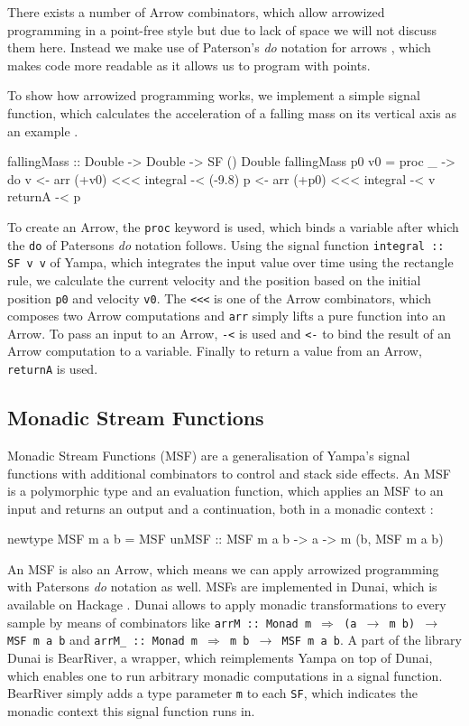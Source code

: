 There exists a number of Arrow combinators, which allow arrowized programming in a point-free style but due to lack of space we will not discuss them here. Instead we make use of Paterson's \textit{do} notation for arrows \cite{paterson_new_2001}, which makes code more readable as it allows us to program with points.

To show how arrowized programming works, we implement a simple signal function, which calculates the acceleration of a falling mass on its vertical axis as an example \cite{perez_testing_2017}.

\begin{HaskellCode}
fallingMass :: Double -> Double -> SF () Double
fallingMass p0 v0 = proc _ -> do
  v <- arr (+v0) <<< integral -< (-9.8)
  p <- arr (+p0) <<< integral -< v
  returnA -< p
\end{HaskellCode}

To create an Arrow, the \texttt{proc} keyword is used, which binds a variable after which the \texttt{do} of Patersons \textit{do} notation \cite{paterson_new_2001} follows. Using the signal function \texttt{integral :: SF v v} of Yampa, which integrates the input value over time using the rectangle rule, we calculate the current velocity and the position based on the initial position \texttt{p0} and velocity \texttt{v0}. The \texttt{<<<} is one of the Arrow combinators, which composes two Arrow computations and \texttt{arr} simply lifts a pure function into an Arrow. To pass an input to an Arrow, \texttt{-<} is used and \texttt{<-} to bind the result of an Arrow computation to a variable. Finally to return a value from an Arrow, \texttt{returnA} is used.

\subsection{Monadic Stream Functions}
\label{sec:back_msf}
Monadic Stream Functions (MSF) are a generalisation of Yampa's signal functions with additional combinators to control and stack side effects. An MSF is a polymorphic type and an evaluation function, which applies an MSF to an input and returns an output and a continuation, both in a monadic context \cite{perez_extensible_2017,perez_functional_2016}:
\begin{HaskellCode}
newtype MSF m a b = MSF {unMSF :: MSF m a b -> a -> m (b, MSF m a b)}
\end{HaskellCode}

An MSF is also an Arrow, which means we can apply arrowized programming with Patersons \textit{do} notation as well. MSFs are implemented in Dunai, which is available on Hackage \cite{dunai_library}. Dunai allows to apply monadic transformations to every sample by means of combinators like \texttt{arrM :: Monad m $\Rightarrow$ (a $\rightarrow$ m b) $\rightarrow$ MSF m a b} and \texttt{arrM\_ :: Monad m $\Rightarrow$ m b $\rightarrow$ MSF m a b}. A part of the library Dunai is BearRiver, a wrapper, which reimplements Yampa on top of Dunai, which enables one to run arbitrary monadic computations in a signal function. BearRiver simply adds a type parameter \texttt{m} to each \texttt{SF}, which indicates the monadic context this signal function runs in.

